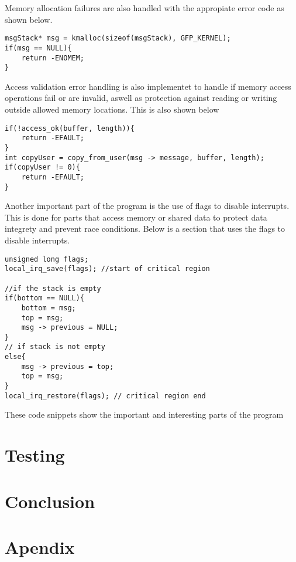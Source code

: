 \documentclass[12pt,a4paper]{report}
\begin{document}
Memory allocation failures are also handled with the appropiate error code as shown below.
\begin{verbatim}
msgStack* msg = kmalloc(sizeof(msgStack), GFP_KERNEL);
if(msg == NULL){
    return -ENOMEM;
}
\end{verbatim}
Access validation error handling is also implementet to handle if memory access operations fail or are invalid, aswell as protection against reading or writing outside allowed memory locations. This is also shown below
\begin{verbatim}
if(!access_ok(buffer, length)){
    return -EFAULT;
}
int copyUser = copy_from_user(msg -> message, buffer, length);
if(copyUser != 0){
    return -EFAULT;
}
\end{verbatim}
Another important part of the program is the use of flags to disable interrupts. This is done for parts that access memory or shared data to protect data integrety and prevent race conditions. Below is a section that uses the flags to disable interrupts.
\begin{verbatim}
unsigned long flags;
local_irq_save(flags); //start of critical region

//if the stack is empty
if(bottom == NULL){
    bottom = msg;
    top = msg;
    msg -> previous = NULL;
}
// if stack is not empty
else{
    msg -> previous = top;
    top = msg;
}
local_irq_restore(flags); // critical region end
\end{verbatim}

These code snippets show the important and interesting parts of the program


\section{Testing}

\section{Conclusion}

\section{Apendix}
\end{document}
